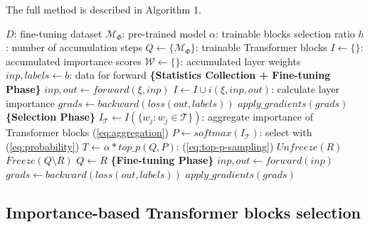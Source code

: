     The full \ourmethodshort{} method is described in Algorithm 1.

    \begin{algorithm}
        \caption{\ourmethodshort{} (\(\alpha, h\))}
        \scriptsize
        \begin{algorithmic}[1]
            \State \(D\): fine-tuning dataset
            \State \(\mathcal{M}_{\Phi}\): pre-trained model
            \State \(\alpha\): trainable blocks selection ratio
            \State \(h\): number of accumulation steps
            \State 
            \State \(Q \gets \{\mathcal{M}_{\Phi}\} \): trainable Transformer blocks
            \State \(I \gets \{\}\): accumulated importance scores
            \State \(\mathcal{W} \gets \{\} \): accumulated layer weights
                \State \(inp, labels \gets b\): data for forward
                    \State \textbf{\{Statistics Collection + Fine-tuning Phase\}}
                        \State \(inp, out \gets forward(\xi, inp)\)
                        \State \(I \gets I \cup i(\xi, inp, out)\): calculate layer importance
                        \State \(grads \gets backward(loss(out, labels))\)
                        \State \(apply\_gradients(grads)\)
                    \EndFor
                    \State \textbf{\{Selection Phase\}}
                        \State \(I_\mathcal{T} \gets I(\{w_j: w_j \in \mathcal{T}\})\): aggregate importance of Transformer blocks (\ref{eq:aggregation})
                    \EndFor
                    \State \(P \gets softmax(I_{\mathcal{T}})\): select with (\ref{eq:probability})
                    \State \(T \gets \alpha * top\_p(Q, P)\): (\ref{eq:top-p-sampling})
                    \State \(Unfreeze(R)\)
                    \State \(Freeze(Q \setminus R)\)
                    \State \(Q \gets R\)
                \Else
                    \State \textbf{\{Fine-tuning Phase\}}
                    \State \(inp, out \gets forward(inp)\)
                    \State \(grads \gets backward(loss(out, labels))\)
                    \State \(apply\_gradients(grads)\)
                \EndIf
                \EndFor
            \EndFor
        \end{algorithmic}
    \end{algorithm}
    \subsection{Importance-based Transformer blocks selection}
